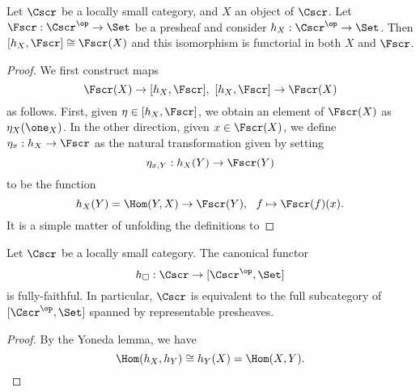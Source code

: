 \begin{theorem}
  Let $\Cscr$ be a locally small category, and $X$ an object of $\Cscr$.
  Let $\Fscr : \Cscr^{\op} \to \Set$ be a presheaf and consider $h_{X} : \Cscr^{\op} \to \Set$.
  Then $[h_{X},\Fscr] \cong \Fscr(X)$ and this isomorphism is functorial in both $X$ and $\Fscr$.
\end{theorem}
\begin{proof}
  We first construct maps
  \[ \Fscr(X) \to [h_{X},\Fscr], \ [h_{X},\Fscr] \to \Fscr(X) \]
  as follows.
  First, given $\eta \in [h_{X},\Fscr]$, we obtain an element of $\Fscr(X)$ as $\eta_{X}(\one_{X})$.
  In the other direction, given $x \in \Fscr(X)$, we define $\eta_{x} : h_{X} \to \Fscr$ as the natural transformation given by setting
  \[ \eta_{x,Y} : h_{X}(Y) \to \Fscr(Y) \]
  to be the function
  \[ h_{X}(Y) = \Hom(Y,X) \to \Fscr(Y), \ \ f \mapsto \Fscr(f)(x). \]
  It is a simple matter of unfolding the definitions to 
\end{proof}

\begin{corollary}
  Let $\Cscr$ be a locally small category.
  The canonical functor
  \[ h_{\square} : \Cscr \to [\Cscr^{\op},\Set] \]
  is fully-faithful.
  In particular, $\Cscr$ is equivalent to the full subcategory of $[\Cscr^{\op},\Set]$ spanned by representable presheaves.
\end{corollary}
\begin{proof}
  By the Yoneda lemma, we have
  \[ \Hom(h_{X},h_{Y}) \cong h_{Y}(X) = \Hom(X,Y). \]
\end{proof}

